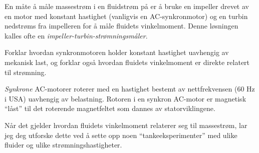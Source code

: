 

En måte å måle massestrøm i en fluidstrøm på er å bruke en impeller drevet av en motor med konstant hastighet (vanligvis en AC-synkronmotor) og en turbin nedstrøms fra impelleren for å måle fluidets vinkelmoment. Denne løsningen kalles ofte en \textit{impeller-turbin-strømningsmåler}.

Forklar hvordan synkronmotoren holder konstant hastighet uavhengig av mekanisk last, og forklar også hvordan fluidets vinkelmoment er direkte relatert til strømning.







\textit{Synkrone} AC-motorer roterer med en hastighet bestemt av nettfrekvensen (60 Hz i USA) uavhengig av belastning. Rotoren i en synkron AC-motor er magnetisk ``låst'' til det roterende magnetfeltet som dannes av statorviklingene.

Når det gjelder hvordan fluidets vinkelmoment relaterer seg til massestrøm, lar jeg deg utforske dette ved å sette opp noen ``tankeeksperimenter'' med ulike fluider og ulike strømningshastigheter.










